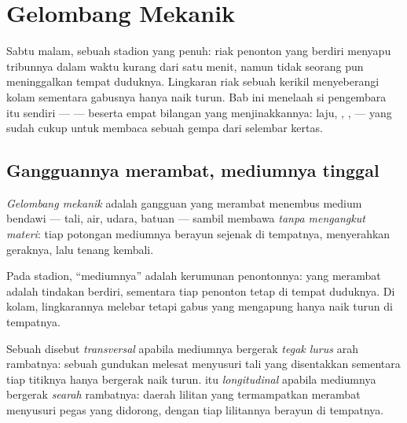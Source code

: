 \chapter{Gelombang Mekanik}\label{ch:g12:mechanical-waves}

Sabtu malam, sebuah stadion yang penuh: riak penonton yang berdiri
menyapu tribunnya dalam waktu kurang dari satu menit, namun tidak
seorang pun meninggalkan tempat duduknya. Lingkaran riak sebuah kerikil
menyeberangi kolam sementara gabusnya hanya naik turun. Bab ini menelaah
si pengembara itu sendiri ---  --- beserta empat bilangan yang
menjinakkannya: laju, , ,  --- yang
sudah cukup untuk membaca sebuah gempa dari selembar kertas.

\section{Gangguannya merambat, mediumnya tinggal}

\begin{definition}\label{def:g12:mechanical-waves:wave}
\emph{Gelombang mekanik} adalah gangguan yang
merambat menembus medium bendawi --- tali, air, udara, batuan --- sambil
membawa  \emph{tanpa mengangkut materi}: tiap potongan mediumnya
berayun sejenak di tempatnya, menyerahkan geraknya, lalu tenang kembali.
\end{definition}

\begin{example}\label{ex:g12:mechanical-waves:transport}
Pada  stadion, ``mediumnya'' adalah kerumunan penontonnya: yang
merambat adalah tindakan berdiri, sementara tiap penonton tetap di
tempat duduknya. Di kolam, lingkarannya melebar tetapi gabus yang
mengapung hanya naik turun di tempatnya.
\end{example}

\begin{definition}\label{def:g12:mechanical-waves:transverse}
Sebuah  disebut \emph{transversal}
apabila mediumnya bergerak \emph{tegak lurus} arah rambatnya: sebuah
gundukan melesat menyusuri tali yang disentakkan sementara tiap titiknya
hanya bergerak naik turun.  itu \emph{longitudinal} apabila mediumnya bergerak \emph{searah} rambatnya: daerah
lilitan yang termampatkan merambat menyusuri pegas yang didorong, dengan
tiap lilitannya berayun di tempatnya.
\end{definition}

